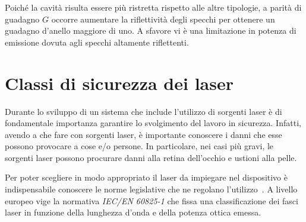 Poiché la cavità risulta essere più ristretta rispetto alle altre tipologie, a parità di guadagno $G$ occorre aumentare la riflettività degli specchi per ottenere un guadagno d'anello maggiore di uno. A sfavore vi è una limitazione in potenza di emissione dovuta agli specchi altamente riflettenti.

\section{Classi di sicurezza dei laser}
Durante lo sviluppo di un sistema che include l'utilizzo di sorgenti laser è di fondamentale importanza garantire lo svolgimento del lavoro in sicurezza. Infatti, avendo a che fare con sorgenti laser, è importante conoscere i danni che esse possono provocare a cose e/o persone. In particolare, nei casi più gravi, le sorgenti laser possono procurare danni alla retina dell'occhio e ustioni alla pelle. 

Per poter scegliere in modo appropriato il laser da impiegare nel dispositivo è indispensabile conoscere le norme legislative che ne regolano l'utilizzo~\cite{ans}. A livello europeo vige la normativa \emph{IEC/EN 60825-1} che fissa una classificazione dei fasci laser in funzione della lunghezza d'onda e della potenza ottica emessa. 

